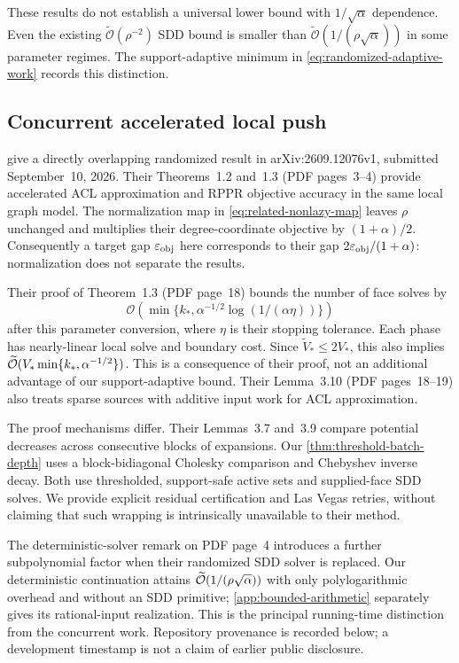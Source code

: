 These results do not establish a universal lower bound with
$1/\sqrt\alpha$ dependence. Even the existing $\widetilde{\mathcal{O}}(\rho^{-2})$
SDD bound is smaller than $\widetilde{\mathcal{O}}(1/(\rho\sqrt\alpha))$ in
some parameter regimes. The support-adaptive minimum in
\cref{eq:randomized-adaptive-work} records this distinction.

\subsection{Concurrent accelerated local push}

\citet{cui2026accelerating} give a directly overlapping randomized result
in arXiv:2609.12076v1, submitted September~10, 2026. Their Theorems~1.2
and~1.3 (PDF pages~3--4) provide accelerated ACL approximation and RPPR
objective accuracy in the same local graph model. The normalization map
in \cref{eq:related-nonlazy-map} leaves $\rho$ unchanged and multiplies
their degree-coordinate objective by $(1+\alpha)/2$. Consequently a
target gap $\varepsilon_{\mathrm{obj}}$ here corresponds to their gap
$2\varepsilon_{\mathrm{obj}}/(1+\alpha)$: normalization does not separate the results.

Their proof of Theorem~1.3 (PDF page~18) bounds the number of face solves
by
\[
 \mathcal{O}(\min\{k_*,\alpha^{-1/2}\log(1/(\alpha\eta))\})
\]
after this parameter conversion, where $\eta$ is their stopping tolerance.
Each phase has nearly-linear local solve and boundary cost. Since
$\widetilde V_*\leq2V_*$, this also implies
$\widetilde{\mathcal{O}}(V_*\min\{k_*,\alpha^{-1/2}\})$. This is a consequence of their
proof, not an additional advantage of our support-adaptive bound.
Their Lemma~3.10 (PDF pages~18--19) also treats sparse sources with
additive input work for ACL approximation.

The proof mechanisms differ. Their Lemmas~3.7 and~3.9 compare potential
decreases across consecutive blocks of expansions. Our
\cref{thm:threshold-batch-depth} uses a block-bidiagonal Cholesky
comparison and Chebyshev inverse decay. Both use thresholded, support-safe
active sets and supplied-face SDD solves. We provide explicit residual
certification and Las Vegas retries, without claiming that such wrapping
is intrinsically unavailable to their method.

The deterministic-solver remark on PDF page~4 introduces a further
subpolynomial factor when their randomized SDD solver is replaced.
Our deterministic continuation attains
$\widetilde{\mathcal{O}}(1/(\rho\sqrt\alpha))$ with only polylogarithmic overhead and
without an SDD primitive; \cref{app:bounded-arithmetic} separately gives
its rational-input realization. This is the principal running-time
distinction from the concurrent work. Repository provenance is recorded
below; a development timestamp is not a claim of earlier public disclosure.

